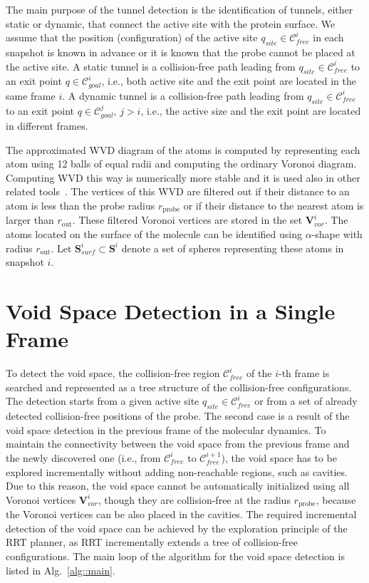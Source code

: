 \documentclass[usletter, 10pt, conference]{svjour3}      %
\def\qinit{q_{site}}
\def\CG{\mathcal{C}_{goal}}
\def\CF{\mathcal{C}_{free}}
\def\VV{\mathbf{V}_{vor}}
\def\probe{r_{\mathrm{probe}}}
\def\gprobe{r_{\mathrm{out}}}
\def\SS{\mathbf{S}}
\def\SSA{\mathbf{S}_{surf}}
\begin{document}
The main purpose of the tunnel detection is the identification of tunnels, either static or dynamic, that connect the active site with the protein surface.
We assume that the position (configuration) of the active site $\qinit \in \CF^i$ in each snapshot is known in advance or it is known that the probe cannot be placed at the active site.
A static tunnel is a collision-free path leading from $\qinit \in \CF^i$ to an exit point $q \in \CG^i$, i.e., both active site and the exit point are located in the same frame $i$.
A dynamic tunnel is a collision-free path leading from $\qinit \in \CF^i$ to an exit point $q \in \CG^j$, $j>i$, i.e., the active size and the exit point are located in different frames.

The approximated WVD diagram of the atoms is computed by representing each atom using 12 balls of equal radii and computing the ordinary Voronoi diagram.
Computing WVD this way is numerically more stable and it is used also in other related tools~\cite{caver3,yaffe2008}.
The vertices of this WVD are filtered out if their distance to an atom is less than the probe radius $\probe$ or if their distance to the nearest atom is larger than $\gprobe$.
These filtered Voronoi vertices are stored in the set $\VV^i$.
The atoms located on the surface of the molecule can be identified using \mbox{$\alpha$-shape} with radius $\gprobe$.
Let $\SSA^i \subset \SS^i$ denote a set of spheres representing these atoms in snapshot $i$.


\section{Void Space Detection in a Single Frame} 

To detect the void space, the collision-free region $\CF^i$ of the $i$-th frame is searched and represented as a tree structure of the collision-free configurations.
The detection starts from a given active site $\qinit \in \CF^i$ or from a set of already detected collision-free positions of the probe.
The second case is a result of the void space detection in the previous frame of the molecular dynamics.
To maintain the connectivity between the void space from the previous frame and the newly discovered one (i.e., from $\CF^i$ to $\CF^{i+1}$), the void space has to be explored incrementally without adding non-reachable regions, such as cavities.
Due to this reason, the void space cannot be automatically initialized using all Voronoi vertices $\VV^i$, though they are collision-free at the radius $\probe$, because the Voronoi vertices can be also placed in the cavities.
The required incremental detection of the void space can be achieved by the exploration principle of the RRT planner, as RRT incrementally extends a tree of collision-free configurations.
The main loop of the algorithm for the void space detection is listed in Alg.~\ref{alg::main}. 
\end{document}
